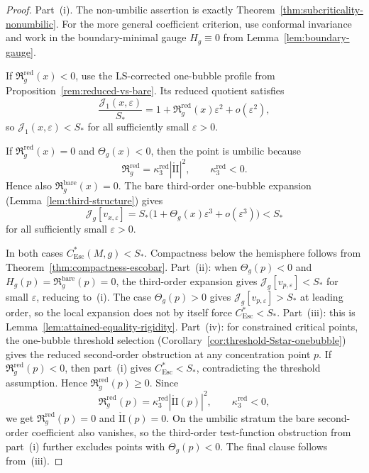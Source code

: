 \documentclass[11pt,reqno,a4paper]{amsart}
\numberwithin{equation}{section}
\theoremstyle{plain}
\newcommand{\Esc}{\ensuremath{\mathrm{Esc}}}
\theoremstyle{remark}
\theoremstyle{plain}
\begin{document}
\begin{proof}[Proof]
Part~(i).  The non-umbilic assertion is exactly
Theorem~\ref{thm:subcriticality-nonumbilic}.  For the more general coefficient
criterion, use conformal invariance and work in the boundary-minimal gauge
$H_g\equiv0$ from Lemma~\ref{lem:boundary-gauge}.

If $\mathfrak R_g^{\mathrm{red}}(x)<0$, use the LS-corrected one-bubble profile
from Proposition~\ref{rem:reduced-vs-bare}.  Its reduced quotient satisfies
\[
\frac{\mathcal J_1(x,\varepsilon)}{S_\ast}
=1+\mathfrak R_g^{\mathrm{red}}(x)\varepsilon^2+o(\varepsilon^2),
\]
so $\mathcal J_1(x,\varepsilon)<S_\ast$ for all sufficiently small
$\varepsilon>0$.

If $\mathfrak R_g^{\mathrm{red}}(x)=0$ and $\Theta_g(x)<0$, then the point is
umbilic because
\[
\mathfrak R_g^{\mathrm{red}}
=\kappa_3^{\mathrm{red}}|\mathring{\mathrm{II}}|^2,
\qquad \kappa_3^{\mathrm{red}}<0.
\]
Hence also $\mathfrak R_g^{\mathrm{bare}}(x)=0$.  The bare third-order
one-bubble expansion (Lemma~\ref{lem:third-structure}) gives
\[
\mathcal J_g[v_{x,\varepsilon}]
=S_\ast\bigl(1+\Theta_g(x)\varepsilon^3+o(\varepsilon^3)\bigr)<S_\ast
\]
for all sufficiently small $\varepsilon>0$.

In both cases $C_{\Esc}^*(M,g)<S_\ast$. Compactness below the hemisphere follows
from Theorem~\ref{thm:compactness-escobar}.
Part~(ii): when $\Theta_g(p)<0$ and $H_g(p)=\mathfrak R_g^{\mathrm{bare}}(p)=0$, the third-order expansion gives $\mathcal J_g[v_{p,\varepsilon}]<S_\ast$ for small $\varepsilon$, reducing to~(i). The case $\Theta_g(p)>0$ gives $\mathcal J_g[v_{p,\varepsilon}]>S_\ast$ at leading order, so the local expansion does not by itself force $C_{\Esc}^*<S_\ast$.
Part~(iii): this is Lemma~\ref{lem:attained-equality-rigidity}.  %
Part~(iv): for constrained critical points, the one-bubble threshold selection
(Corollary~\ref{cor:threshold-Sstar-onebubble}) gives the reduced second-order
obstruction at any concentration point $p$.  If
$\mathfrak R_g^{\mathrm{red}}(p)<0$, then part~(i) gives
$C^*_{\Esc}<S_\ast$, contradicting the threshold assumption. Hence
$\mathfrak R_g^{\mathrm{red}}(p)\ge0$.  Since
\[
\mathfrak R_g^{\mathrm{red}}(p)
=\kappa_3^{\mathrm{red}}|\mathring{\mathrm{II}}(p)|^2,
\qquad \kappa_3^{\mathrm{red}}<0,
\]
we get $\mathfrak R_g^{\mathrm{red}}(p)=0$ and
$\mathring{\mathrm{II}}(p)=0$.  On the umbilic stratum the bare second-order
coefficient also vanishes, so the third-order test-function obstruction from
part~(i) further excludes points with $\Theta_g(p)<0$.  The final clause follows
from~(iii).
\end{proof}
\end{document}
